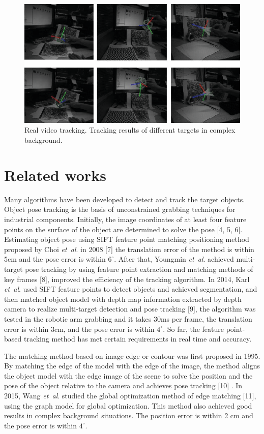 \documentclass{cta-author}
\begin{document}
\begin{figure}[!h]
  \centering
\includegraphics{fig1.eps}
\caption{ Real video tracking. Tracking results of different targets in complex background.}
\label{1}
\end{figure}
  

\section{Related works}\label{sec2}

Many algorithms have been developed to detect and track the target objects. 
Object pose tracking is the basis of unconstrained grabbing techniques for industrial 
components. Initially, the image coordinates of at least four feature points on the surface
 of the object are determined to solve the pose [4, 5, 6]. Estimating object pose using SIFT 
 feature point matching positioning method proposed by Choi \textit{et~al}. in 2008 [7] the translation 
 error of the method is within 5cm and the pose error is within $6^{\circ}$. After that, Youngmin \textit{et~al}. 
 achieved multi-target pose tracking by using feature point extraction and matching 
 methods of key frames [8], improved the efficiency of the tracking algorithm. In 2014, 
 Karl \textit{et~al}. used SIFT feature points to detect objects and achieved segmentation, and then 
 matched object model with depth map information extracted by depth camera to realize multi-target 
 detection and pose tracking [9], the algorithm was tested in the robotic arm grabbing and it takes 
 30ms per frame, the translation error is within 3cm, and the pose error is within $4^{\circ}$. So far, 
 the feature point-based tracking method has met certain requirements in real time and accuracy.

 The matching method based on image edge or contour was first proposed in 1995. 
 By matching the edge of the model with the edge of the image, the method aligns 
 the object model with the edge image of the scene to solve the position and the pose of 
 the object relative to the camera and achieves pose tracking [10] . In 2015, Wang \textit{et~al}. 
 studied the global optimization method of edge matching [11], using the graph model for global 
 optimization. This method also achieved good results in complex background situations.
 The position error is within 2 cm and the pose error is within $4^{\circ}$.
\end{document}
